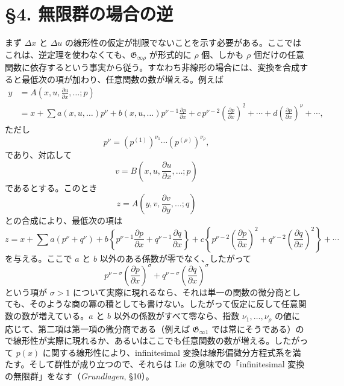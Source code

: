\documentclass[11pt]{article}
\newcommand{\D}{\Delta}
\providecommand{\G}{\mathfrak G}
\providecommand{\p}{\partial}
\begin{document}
\section*{\S{}4. 無限群の場合の逆}

まず \(\D x\) と \(\D u\) の線形性の仮定が制限でないことを示す必要がある。ここではこれは、逆定理を使わなくても、\(\G_{\infty\rho}\) が形式的に \(\rho\) 個、しかも \(\rho\) 個だけの任意関数に依存するという事実から従う。すなわち非線形の場合には、変換を合成すると最低次の項が加わり、任意関数の数が増える。例えば
\[
\begin{aligned}
y&=A\!\left(x,u,\frac{\p u}{\p x},\ldots;p\right)\\
&=x+\sum a(x,u,\ldots)p^\nu
+b(x,u,\ldots)p^{\nu-1}\frac{\p p}{\p x}
+c\,p^{\nu-2}\left(\frac{\p p}{\p x}\right)^2+\cdots
+d\left(\frac{\p p}{\p x}\right)^\nu+\cdots,
\end{aligned}
\]
ただし
\[
p^\nu=(p^{(1)})^{\nu_1}\cdots(p^{(\rho)})^{\nu_\rho},
\]
であり、対応して
\[
v=B\!\left(x,u,\frac{\p u}{\p x},\ldots;p\right)
\]
であるとする。このとき
\[
z=A\!\left(y,v,\frac{\p v}{\p y},\ldots;q\right)
\]
との合成により、最低次の項は
\[
z=x+\sum a(p^\nu+q^\nu)+
b\left\{p^{\nu-1}\frac{\p p}{\p x}+q^{\nu-1}\frac{\p q}{\p x}\right\}
+c\left\{p^{\nu-2}\left(\frac{\p p}{\p x}\right)^2
+q^{\nu-2}\left(\frac{\p q}{\p x}\right)^2\right\}+\cdots
\]
を与える。ここで \(a\) と \(b\) 以外のある係数が零でなく、したがって
\[
p^{\nu-\sigma}\left(\frac{\p p}{\p x}\right)^\sigma
+q^{\nu-\sigma}\left(\frac{\p q}{\p x}\right)^\sigma
\]
という項が \(\sigma>1\) について実際に現れるなら、それは単一の関数の微分商としても、そのような商の冪の積としても書けない。したがって仮定に反して任意関数の数が増えている。\(a\) と \(b\) 以外の係数がすべて零なら、指数 \(\nu_1,\ldots,\nu_\rho\) の値に応じて、第二項は第一項の微分商である（例えば \(\G_{\infty1}\) では常にそうである）ので線形性が実際に現れるか、あるいはここでも任意関数の数が増える。したがって \(p(x)\) に関する線形性により、infinitesimal 変換は線形偏微分方程式系を満たす。そして群性が成り立つので、それらは Lie の意味での「infinitesimal 変換の無限群」をなす（\emph{Grundlagen}, \S{}10）。
\end{document}
